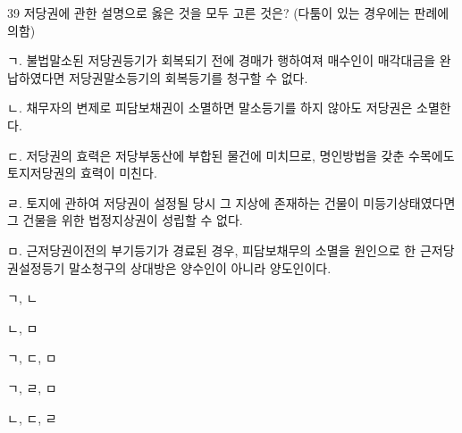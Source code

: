 \begin{question}{39}
저당권에 관한 설명으로 옳은 것을 모두 고른 것은? (다툼이 있는 경우에는 판례에 의함)
\begin{framedtext}
ㄱ. 불법말소된 저당권등기가 회복되기 전에 경매가 행하여져 매수인이 매각대금을 완납하였다면 저당권말소등기의 회복등기를 청구할 수 없다. \par
ㄴ. 채무자의 변제로 피담보채권이 소멸하면 말소등기를 하지 않아도 저당권은 소멸한다. \par
ㄷ. 저당권의 효력은 저당부동산에 부합된 물건에 미치므로, 명인방법을 갖춘 수목에도 토지저당권의 효력이 미친다. \par
ㄹ. 토지에 관하여 저당권이 설정될 당시 그 지상에 존재하는 건물이 미등기상태였다면 그 건물을 위한 법정지상권이 성립할 수 없다. \par
ㅁ. 근저당권이전의 부기등기가 경료된 경우, 피담보채무의 소멸을 원인으로 한 근저당권설정등기 말소청구의 상대방은 양수인이 아니라 양도인이다.
\end{framedtext}
\begin{choices}
  \item ㄱ, ㄴ
  \item ㄴ, ㅁ
  \item ㄱ, ㄷ, ㅁ
  \item ㄱ, ㄹ, ㅁ
  \item ㄴ, ㄷ, ㄹ
\end{choices}
\end{question}
